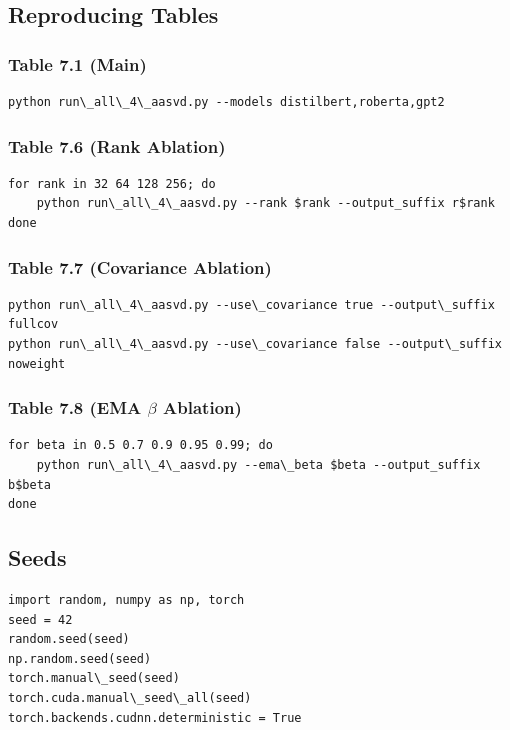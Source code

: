 \subsection{Reproducing Tables}

\subsubsection{Table 7.1 (Main)}

\begin{lstlisting}
python run\_all\_4\_aasvd.py --models distilbert,roberta,gpt2
\end{lstlisting}

\subsubsection{Table 7.6 (Rank Ablation)}

\begin{lstlisting}
for rank in 32 64 128 256; do
    python run\_all\_4\_aasvd.py --rank $rank --output_suffix r$rank
done
\end{lstlisting}

\subsubsection{Table 7.7 (Covariance Ablation)}

\begin{lstlisting}
python run\_all\_4\_aasvd.py --use\_covariance true --output\_suffix fullcov
python run\_all\_4\_aasvd.py --use\_covariance false --output\_suffix noweight
\end{lstlisting}

\subsubsection{Table 7.8 (EMA $\beta$ Ablation)}

\begin{lstlisting}
for beta in 0.5 0.7 0.9 0.95 0.99; do
    python run\_all\_4\_aasvd.py --ema\_beta $beta --output_suffix b$beta
done
\end{lstlisting}

\subsection{Seeds}

\begin{lstlisting}
import random, numpy as np, torch
seed = 42
random.seed(seed)
np.random.seed(seed)
torch.manual\_seed(seed)
torch.cuda.manual\_seed\_all(seed)
torch.backends.cudnn.deterministic = True
\end{lstlisting}

